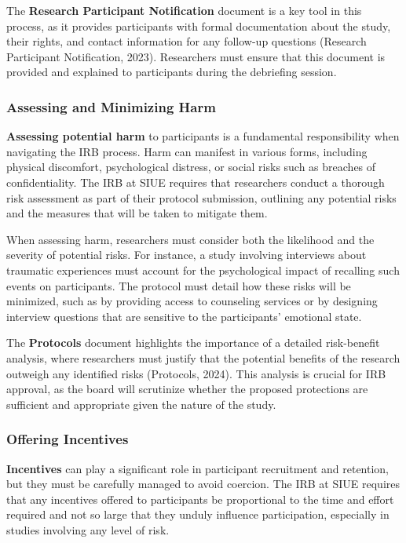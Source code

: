 \documentclass[
]{book}
\begin{document}
The \textbf{Research Participant Notification} document is a key tool in this process, as it provides participants with formal documentation about the study, their rights, and contact information for any follow-up questions (Research Participant Notification, 2023). Researchers must ensure that this document is provided and explained to participants during the debriefing session.

\subsubsection*{Assessing and Minimizing Harm}\label{assessing-and-minimizing-harm}

\textbf{Assessing potential harm} to participants is a fundamental responsibility when navigating the IRB process. Harm can manifest in various forms, including physical discomfort, psychological distress, or social risks such as breaches of confidentiality. The IRB at SIUE requires that researchers conduct a thorough risk assessment as part of their protocol submission, outlining any potential risks and the measures that will be taken to mitigate them.

When assessing harm, researchers must consider both the likelihood and the severity of potential risks. For instance, a study involving interviews about traumatic experiences must account for the psychological impact of recalling such events on participants. The protocol must detail how these risks will be minimized, such as by providing access to counseling services or by designing interview questions that are sensitive to the participants' emotional state.

The \textbf{Protocols} document highlights the importance of a detailed risk-benefit analysis, where researchers must justify that the potential benefits of the research outweigh any identified risks (Protocols, 2024). This analysis is crucial for IRB approval, as the board will scrutinize whether the proposed protections are sufficient and appropriate given the nature of the study.

\subsubsection*{Offering Incentives}\label{offering-incentives}

\textbf{Incentives} can play a significant role in participant recruitment and retention, but they must be carefully managed to avoid coercion. The IRB at SIUE requires that any incentives offered to participants be proportional to the time and effort required and not so large that they unduly influence participation, especially in studies involving any level of risk.
\end{document}
